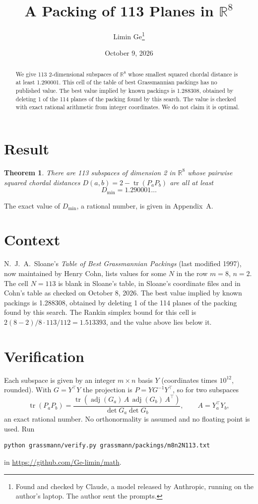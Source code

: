 \documentclass[11pt,a4paper]{article}
\title{A Packing of 113 Planes in $\mathbb{R}^{8}$}
\author{Limin Ge\thanks{Found and checked by Claude, a model released by Anthropic, running on the author's laptop. The author sent the prompts.}}
\date{October 9, 2026}
\newtheorem*{theorem}{Theorem}
\begin{document}
\maketitle
\begin{abstract}
We give 113 2-dimensional subspaces of $\mathbb{R}^{8}$ whose smallest squared chordal distance is at least 1.290001. This cell of the table of best Grassmannian packings has no published value. The best value implied by known packings is 1.288308, obtained by deleting 1 of the 114 planes of the packing found by this search. The value is checked with exact rational arithmetic from integer coordinates. We do not claim it is optimal.
\end{abstract}

\section{Result}
\begin{theorem}
There are 113 subspaces of dimension 2 in $\mathbb{R}^{8}$ whose pairwise squared chordal distances $D(a,b) = 2 - \operatorname{tr}(P_aP_b)$ are all at least
\[ D_{\min} = 1.290001\ldots \]
\end{theorem}
The exact value of $D_{\min}$, a rational number, is given in Appendix~A.


\section{Context}
N.~J.~A.~Sloane's \emph{Table of Best Grassmannian Packings} (last modified 1997), now maintained by Henry Cohn, lists values for some $N$ in the row $m=8$, $n=2$. The cell $N=113$ is blank in Sloane's table, in Sloane's coordinate files and in Cohn's table as checked on October 8, 2026. The best value implied by known packings is 1.288308, obtained by deleting 1 of the 114 planes of the packing found by this search. The Rankin simplex bound for this cell is $2(8-2)/8\cdot 113/112 = 1.513393$, and the value above lies below it.


\section{Verification}
Each subspace is given by an integer $m\times n$ basis $Y$ (coordinates times $10^{12}$, rounded). With $G=Y^\top Y$ the projection is $P=YG^{-1}Y^\top$, so for two subspaces
\[ \operatorname{tr}(P_aP_b)=\frac{\operatorname{tr}(\operatorname{adj}(G_a)\,A\,\operatorname{adj}(G_b)\,A^\top)}{\det G_a\det G_b},\qquad A=Y_a^\top Y_b, \]
an exact rational number. No orthonormality is assumed and no floating point is used. Run
\begin{verbatim}
python grassmann/verify.py grassmann/packings/m8n2N113.txt
\end{verbatim}
in \url{https://github.com/Ge-limin/math}.
\end{document}
